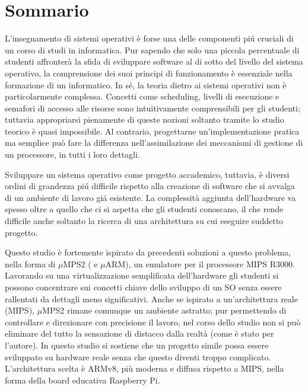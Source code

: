 \documentclass[12pt,a4paper,openright,twoside]{report}
\begin{document}
\clearpage{\pagestyle{empty}\cleardoublepage}%
\chapter*{Sommario}
L'insegnamento di sistemi operativi \`e forse una delle componenti pi\'u cruciali di un
corso di studi in informatica. Pur sapendo che solo una piccola percentuale di studenti
affronter\`a la sfida di sviluppare software al di sotto del livello del sistema
operativo, la comprensione dei suoi principi di funzionamento \`e essenziale nella
formazione di un informatico. In s\'e, la teoria dietro ai sistemi operativi non 
\`e particolarmente complessa. Concetti come scheduling, livelli di esecuzione e
semafori di accesso alle risorse sono intuitivamente comprensibili per gli studenti;
tuttavia appropriarsi pienamente di queste nozioni soltanto tramite lo studio 
teorico \`e quasi impossibile. Al contrario, progettarne un'implementazione
pratica ma semplice pu\`o fare la differenza nell'assimilazione dei meccanismi
di gestione di un processore, in tutti i loro dettagli.

Sviluppare un sistema operativo come progetto accademico, tuttavia, \`e diversi
ordini di grandezza pi\'u difficile rispetto alla creazione di software che si 
avvalga di un ambiente di lavoro gi\'a esistente. La complessit\`a aggiunta 
dell'hardware va spesso oltre a quello che ci si aspetta che gli studenti conoscano,
il che rende difficile anche soltanto la ricerca di una architettura su cui
eseguire suddetto progetto.

Questo studio \`e fortemente ispirato da precedenti soluzioni a questo problema,
nella forma di $\mu$MPS2 ( e $\mu$ARM), un emulatore per il processore MIPS R3000.
Lavorando su una virtualizzazione semplificata dell'hardware gli studenti si possono
concentrare sui concetti chiave dello sviluppo di un SO senza essere rallentati
da dettagli meno significativi. Anche se ispirato a un'architettura reale (MIPS),
$\mu$MPS2 rimane comunque un ambiente astratto; pur permettendo di controllare 
e direzionare con precisione il lavoro, nel corso dello studio non si 
pu\`o eliminare del tutto la sensazione di distacco dalla realt\`a (come \`e stato 
per l'autore). In questo studio si sostiene che un progetto simile possa essere
sviluppato su hardware reale senza che questo diventi troppo complicato. L'architettura
scelta \`e ARMv8, pi\`u moderna e diffusa rispetto a MIPS, nella forma della 
board educativa Raspberry Pi.
\end{document}

